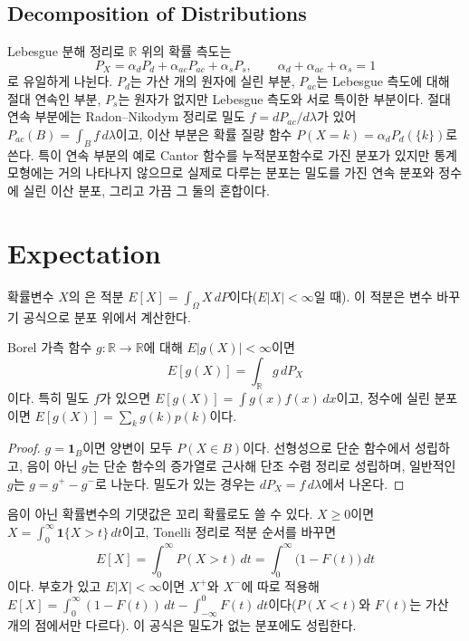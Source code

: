 \subsection{Decomposition of Distributions}

Lebesgue 분해 정리로 $\mathbb R$ 위의 확률 측도는
\[
P_X=\alpha_dP_d+\alpha_{ac}P_{ac}+\alpha_sP_s,\qquad\alpha_d+\alpha_{ac}+\alpha_s=1
\]
로 유일하게 나뉜다. $P_d$는 가산 개의 원자에 실린  부분, $P_{ac}$는 Lebesgue 측도에 대해 절대 연속인 부분, $P_s$는 원자가 없지만 Lebesgue 측도와 서로 특이한 부분이다. 절대 연속 부분에는 Radon--Nikodym 정리로 밀도 $f=dP_{ac}/d\lambda$가 있어 $P_{ac}(B)=\int_Bf\,d\lambda$이고, 이산 부분은 확률 질량 함수 $P(X=k)=\alpha_dP_d(\{k\})$로 쓴다. 특이 연속 부분의 예로 Cantor 함수를 누적분포함수로 가진 분포가 있지만 통계 모형에는 거의 나타나지 않으므로 실제로 다루는 분포는 밀도를 가진 연속 분포와 정수에 실린 이산 분포, 그리고 가끔 그 둘의 혼합이다.

\section{Expectation}
\label{sec:expectation}

확률변수 $X$의 은 적분 $E[X]=\int_\Omega X\,dP$이다($E|X|<\infty$일 때). 이 적분은 변수 바꾸기 공식으로 분포 위에서 계산한다.

\begin{proposition}
\label{prop:lotus}
Borel 가측 함수 $g:\mathbb R\to\mathbb R$에 대해 $E|g(X)|<\infty$이면
\[
E[g(X)]=\int_{\mathbb R}g\,dP_X
\]
이다. 특히 밀도 $f$가 있으면 $E[g(X)]=\int g(x)f(x)\,dx$이고, 정수에 실린 분포이면 $E[g(X)]=\sum_kg(k)p(k)$이다.
\end{proposition}

\begin{proof}
$g=\mathbf 1_B$이면 양변이 모두 $P(X\in B)$이다. 선형성으로 단순 함수에서 성립하고, 음이 아닌 $g$는 단순 함수의 증가열로 근사해 단조 수렴 정리로 성립하며, 일반적인 $g$는 $g=g^+-g^-$로 나눈다. 밀도가 있는 경우는 $dP_X=f\,d\lambda$에서 나온다.
\end{proof}

음이 아닌 확률변수의 기댓값은 꼬리 확률로도 쓸 수 있다. $X\ge0$이면 $X=\int_0^\infty\mathbf 1\{X>t\}\,dt$이고, Tonelli 정리로 적분 순서를 바꾸면
\[
E[X]=\int_0^\infty P(X>t)\,dt=\int_0^\infty\bigl(1-F(t)\bigr)\,dt
\]
이다. 부호가 있고 $E|X|<\infty$이면 $X^+$와 $X^-$에 따로 적용해 $E[X]=\int_0^\infty(1-F(t))\,dt-\int_{-\infty}^0F(t)\,dt$이다($P(X<t)$와 $F(t)$는 가산 개의 점에서만 다르다). 이 공식은 밀도가 없는 분포에도 성립한다.

